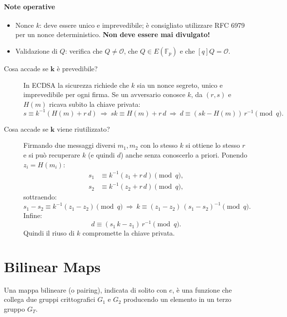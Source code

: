 \documentclass[a4paper, 11pt]{article}
\begin{document}
\paragraph{Note operative}
\begin{itemize}
    \item Nonce $k$: deve essere unico e imprevedibile; è consigliato utilizzare RFC 6979 per un nonce deterministico. \textbf{Non deve essere mai divulgato!}
    \item Validazione di $Q$: verifica che $Q\neq\mathcal{O}$, che $Q\in E(\mathbb{F}_p)$ e che $[q]Q=\mathcal{O}$.
\end{itemize}

\begin{description}
    \item[Cosa accade se $\mathbf{k}$ è prevedibile?] In ECDSA la sicurezza richiede che $k$ sia un nonce segreto, unico e imprevedibile per ogni firma. Se un avversario conosce $k$, da $(r,s)$ e $H(m)$ ricava subito la chiave privata:
    \[
    s \equiv k^{-1}(H(m)+r\,d) \ \Rightarrow\ sk \equiv H(m)+r\,d \ \Rightarrow\ d \equiv (sk - H(m))\,r^{-1} \pmod q.
    \]

    \item[Cosa accade se $\mathbf{k}$ viene riutilizzato?] Firmando due messaggi diversi $m_1,m_2$ con lo stesso $k$ si ottiene lo stesso $r$ e si può recuperare $k$ (e quindi $d$) anche senza conoscerlo a priori. Ponendo $z_i=H(m_i)$:
    \[
    \begin{aligned}
    s_1 &\equiv k^{-1}(z_1 + r\,d) \pmod q,\\
    s_2 &\equiv k^{-1}(z_2 + r\,d) \pmod q,
    \end{aligned}
    \]
    sottraendo:
    \[
    s_1 - s_2 \equiv k^{-1}(z_1 - z_2) \pmod q
    \ \Rightarrow\
    k \equiv (z_1 - z_2)\,(s_1 - s_2)^{-1} \pmod q.
    \]
    Infine:
    \[
    d \equiv (s_1\,k - z_1)\,r^{-1} \pmod q.
    \]
    Quindi il riuso di $k$ compromette la chiave privata.
\end{description}

\newpage

\section{Bilinear Maps}

Una mappa bilineare (o pairing), indicata di solito con $e$, è una funzione che collega due gruppi crittografici $G_1$ e $G_2$ producendo un elemento in un terzo gruppo $G_T$.
\end{document}
